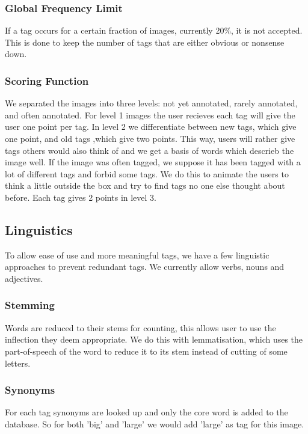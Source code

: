 \subsubsection{Global Frequency Limit}
\label{g14:sec:concepts:spamprevention:frequencylimit}
If a tag occurs for a certain fraction of images, currently 20\%, it is not accepted. This is done to keep the number of tags that are either obvious or nonsense down.

\subsubsection{Scoring Function}
\label{g14:sec:concepts:spamprevention:scoringfunction}
We separated the images into three levels: not yet annotated, rarely annotated, and often annotated. For level 1 images the user recieves each tag will give the user one point per tag. In level 2 we differentiate between new tags, which give one point, and old tags ,which give two points. This way, users will rather give tags others would also think of and we get a basis of words which descrieb the image well. If the image was often tagged, we suppose it has been tagged with a lot of different tags and forbid some tags. We do this to animate the users to think a little outside the box and try to find tags no one else thought about before. Each tag gives 2 points in level 3.


\subsection{Linguistics}
\label{g14:sec:concepts:linguistics}
To allow ease of use and more meaningful tags, we have a few linguistic approaches to prevent redundant tags. We currently allow verbs, nouns and adjectives.



\subsubsection{Stemming}
\label{g14:sec:concepts:linguistics:stemming}
Words are reduced to their stems for counting, this allows user to use the inflection they deem appropriate. We do this with lemmatisation, which uses the part-of-speech of the word to reduce it to its stem instead of cutting of some letters.


\subsubsection{Synonyms}
\label{g14:sec:concepts:linguistics:synonyms}
For each tag synonyms are looked up and only the core word is added to the database. So for both 'big' and 'large' we would add 'large' as tag for this image.


